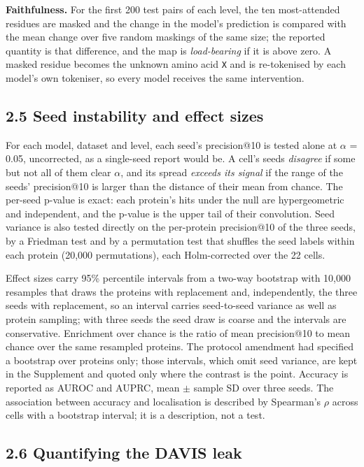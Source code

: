 \documentclass[
  11pt,
]{article}
\begin{document}
\textbf{Faithfulness.} For the first 200 test pairs of each level, the ten most-attended residues are masked and the change in the model's prediction is compared with the mean change over five random maskings of the same size; the reported quantity is that difference, and the map is \emph{load-bearing} if it is above zero. A masked residue becomes the unknown amino acid \texttt{X} and is re-tokenised by each model's own tokeniser, so every model receives the same intervention.

\subsection{2.5 Seed instability and effect sizes}\label{seed-instability-and-effect-sizes}

For each model, dataset and level, each seed's precision@10 is tested alone at $\alpha$ = 0.05, uncorrected, as a single-seed report would be. A cell's seeds \emph{disagree} if some but not all of them clear $\alpha$, and its spread \emph{exceeds its signal} if the range of the seeds' precision@10 is larger than the distance of their mean from chance. The per-seed p-value is exact: each protein's hits under the null are hypergeometric and independent, and the p-value is the upper tail of their convolution. Seed variance is also tested directly on the per-protein precision@10 of the three seeds, by a Friedman test and by a permutation test that shuffles the seed labels within each protein (20,000 permutations), each Holm-corrected over the 22 cells.

Effect sizes carry 95\% percentile intervals from a two-way bootstrap with 10,000 resamples that draws the proteins with replacement and, independently, the three seeds with replacement, so an interval carries seed-to-seed variance as well as protein sampling; with three seeds the seed draw is coarse and the intervals are conservative. Enrichment over chance is the ratio of mean precision@10 to mean chance over the same resampled proteins. The protocol amendment had specified a bootstrap over proteins only; those intervals, which omit seed variance, are kept in the Supplement and quoted only where the contrast is the point. Accuracy is reported as AUROC and AUPRC, mean $\pm$ sample SD over three seeds. The association between accuracy and localisation is described by Spearman's $\rho$ across cells with a bootstrap interval; it is a description, not a test.

\subsection{2.6 Quantifying the DAVIS leak}\label{quantifying-the-davis-leak}
\end{document}

